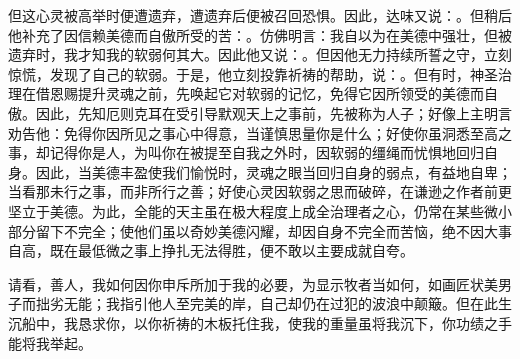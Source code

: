 但这心灵被高举时便遭遗弃，遭遗弃后便被召回恐惧。因此，达味又说：。但稍后他补充了因信赖美德而自傲所受的苦：。仿佛明言：我自以为在美德中强壮，但被遗弃时，我才知我的软弱何其大。因此他又说：。但因他无力持续所誓之守，立刻惊慌，发现了自己的软弱。于是，他立刻投靠祈祷的帮助，说：。但有时，神圣治理在借恩赐提升灵魂之前，先唤起它对软弱的记忆，免得它因所领受的美德而自傲。因此，先知厄则克耳在受引导默观天上之事前，先被称为人子；好像上主明言劝告他：免得你因所见之事心中得意，当谨慎思量你是什么；好使你虽洞悉至高之事，却记得你是人，为叫你在被提至自我之外时，因软弱的缰绳而忧惧地回归自身。因此，当美德丰盈使我们愉悦时，灵魂之眼当回归自身的弱点，有益地自卑；当看那未行之事，而非所行之善；好使心灵因软弱之思而破碎，在谦逊之作者前更坚立于美德。为此，全能的天主虽在极大程度上成全治理者之心，仍常在某些微小部分留下不完全；使他们虽以奇妙美德闪耀，却因自身不完全而苦恼，绝不因大事自高，既在最低微之事上挣扎无法得胜，便不敢以主要成就自夸。\par

请看，善人，我如何因你申斥所加于我的必要，为显示牧者当如何，如画匠状美男子而拙劣无能；我指引他人至完美的岸，自己却仍在过犯的波浪中颠簸。但在此生沉船中，我恳求你，以你祈祷的木板托住我，使我的重量虽将我沉下，你功绩之手能将我举起。\par

